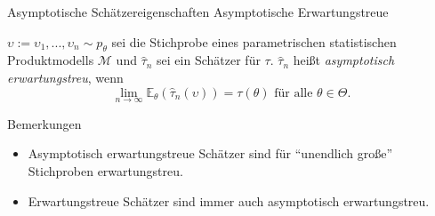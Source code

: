 \documentclass[
  8pt,
  ignorenonframetext,
]{beamer}
\providecommand{\tightlist}{%
  \setlength{\itemsep}{0pt}\setlength{\parskip}{0pt}}
\newcommand{\ups} {\upsilon}
\begin{document}
\begin{frame}{\small Asymptotische Schätzereigenschaften \textbar{}
Asymptotische Erwartungstreue}
\protect\hypertarget{asymptotische-schuxe4tzereigenschaften-asymptotische-erwartungstreue}{}
\small
\begin{definition}
\justifying
$\ups := \ups_1,...,\ups_n \sim p_\theta$ sei die Stichprobe eines parametrischen statistischen
Produktmodells $\mathcal{M}$ und  $\hat{\tau}_n$ sei ein Schätzer für $\tau$.
$\hat{\tau}_n$ heißt \textit{asymptotisch erwartungstreu}, wenn
\begin{equation}
\lim_{n\to\infty} \mathbb{E}_\theta(\hat{\tau}_n(\ups)) = \tau(\theta) \mbox{ für alle }
\theta \in \Theta.
\end{equation}
\end{definition}

\footnotesize

Bemerkungen

\begin{itemize}
\tightlist
\item
  Asymptotisch erwartungstreue Schätzer sind für ``unendlich große''
  Stichproben erwartungstreu.
\item
  Erwartungstreue Schätzer sind immer auch asymptotisch erwartungstreu.
\end{itemize}
\end{frame}
\end{document}
